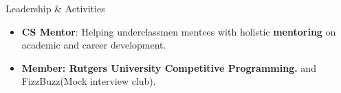 \documentclass{resume}
\begin{document}
\begin{rSection}{Leadership \& Activities} 
\begin{itemize}
    \item \textbf{CS Mentor}: Helping underclassmen mentees with holistic {\bf mentoring} on academic and career development.
    \item  {\bf Member: Rutgers University Competitive Programming.} and FizzBuzz(Mock interview club).
\end{itemize}
\end{rSection}
\end{document}
